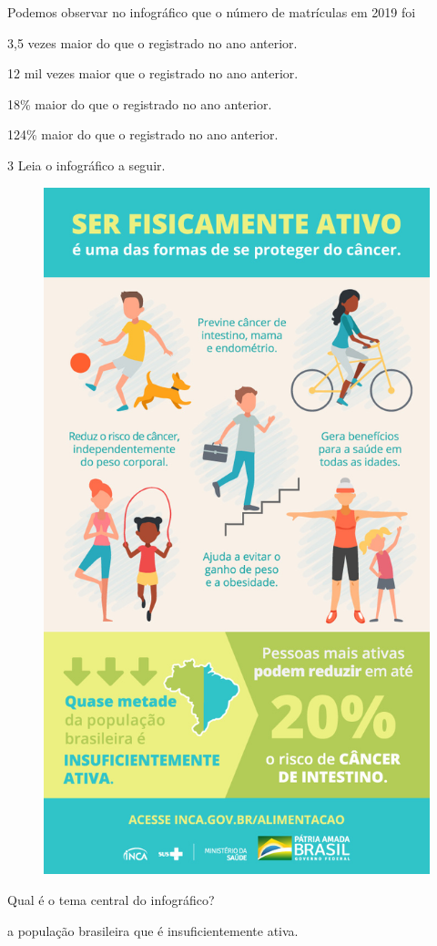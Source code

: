 \begin{conteudo}
\begin{conteudo}
\begin{conteudo}
\begin{conteudo}
Podemos observar no infográfico que o número de matrículas em 2019 foi

\begin{escolha}
\item 3,5 vezes maior do que o registrado no ano anterior.

\item 12 mil vezes maior que o registrado no ano anterior.

\item 18\% maior do que o registrado no ano anterior.

\item 124\% maior do que o registrado no ano anterior.

\end{escolha}

\pagebreak
\num{3} Leia o infográfico a seguir.

\begin{figure}[htpb!]
\centering
\includegraphics[width=.5\textwidth]{media/image34.jpeg}
\end{figure}


Qual é o tema central do infográfico?

\begin{escolha}
\item a população brasileira que é insuficientemente ativa.


\end{escolha}
\end{conteudo}
\end{conteudo}
\end{conteudo}
\end{conteudo}
